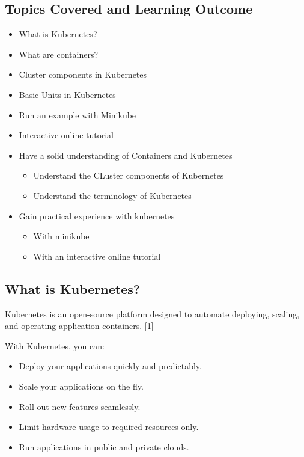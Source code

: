 \subsection{Topics Covered and Learning
Outcome}\label{topics-covered-and-learning-outcome-1}

\begin{itemize}

\item
  What is Kubernetes?
\item
  What are containers?
\item
  Cluster components in Kubernetes
\item
  Basic Units in Kubernetes
\item
  Run an example with Minikube
\item
  Interactive online tutorial
\item
  Have a solid understanding of Containers and Kubernetes

  \begin{itemize}
  
  \item
    Understand the CLuster components of Kubernetes
  \item
    Understand the terminology of Kubernetes
  \end{itemize}
\item
  Gain practical experience with kubernetes

  \begin{itemize}
  
  \item
    With minikube
  \item
    With an interactive online tutorial
  \end{itemize}
\end{itemize}

\subsection{What is Kubernetes?}\label{what-is-kubernetes}

Kubernetes is an open-source platform designed to automate deploying,
scaling, and operating application containers.
{[}\href{https://kubernetes.io/docs/concepts/overview/what-is-kubernetes/}{1}{]}

With Kubernetes, you can:

\begin{itemize}

\item
  Deploy your applications quickly and predictably.
\item
  Scale your applications on the fly.
\item
  Roll out new features seamlessly.
\item
  Limit hardware usage to required resources only.
\item
  Run applications in public and private clouds.
\end{itemize}

